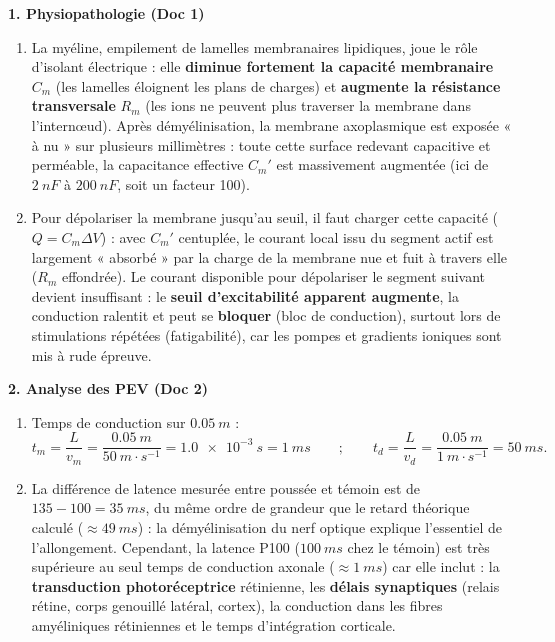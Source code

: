 \documentclass[11pt]{article}
\begin{document}
\begin{corrige}
\textbf{1. Physiopathologie (Doc 1)}
\begin{enumerate}
    \item[a)] La myéline, empilement de lamelles membranaires lipidiques, joue le rôle d'isolant électrique : elle \textbf{diminue fortement la capacité membranaire} $C_m$ (les lamelles éloignent les plans de charges) et \textbf{augmente la résistance transversale} $R_m$ (les ions ne peuvent plus traverser la membrane dans l'internœud). Après démyélinisation, la membrane axoplasmique est exposée « à nu » sur plusieurs millimètres : toute cette surface redevant capacitive et perméable, la capacitance effective $C_m'$ est massivement augmentée (ici de $\SI{2}{nF}$ à $\SI{200}{nF}$, soit un facteur 100).
    \item[b)] Pour dépolariser la membrane jusqu'au seuil, il faut charger cette capacité ($Q = C_m \Delta V$) : avec $C_m'$ centuplée, le courant local issu du segment actif est largement « absorbé » par la charge de la membrane nue et fuit à travers elle ($R_m$ effondrée). Le courant disponible pour dépolariser le segment suivant devient insuffisant : le \textbf{seuil d'excitabilité apparent augmente}, la conduction ralentit et peut se \textbf{bloquer} (bloc de conduction), surtout lors de stimulations répétées (fatigabilité), car les pompes et gradients ioniques sont mis à rude épreuve.
\end{enumerate}
\textbf{2. Analyse des PEV (Doc 2)}
\begin{enumerate}
    \item[a)] Temps de conduction sur $\SI{0,05}{m}$ :
    \[ t_m = \frac{L}{v_m} = \frac{\SI{0,05}{m}}{\SI{50}{m\cdot s^{-1}}} = \SI{1,0e-3}{s} = \SI{1}{ms} \qquad ; \qquad t_d = \frac{L}{v_d} = \frac{\SI{0,05}{m}}{\SI{1}{m\cdot s^{-1}}} = \SI{50}{ms}. \]
    \item[b)] La différence de latence mesurée entre poussée et témoin est de $135 - 100 = \SI{35}{ms}$, du même ordre de grandeur que le retard théorique calculé ($\approx \SI{49}{ms}$) : la démyélinisation du nerf optique explique l'essentiel de l'allongement. Cependant, la latence P100 ($\SI{100}{ms}$ chez le témoin) est très supérieure au seul temps de conduction axonale ($\approx \SI{1}{ms}$) car elle inclut : la \textbf{transduction photoréceptrice} rétinienne, les \textbf{délais synaptiques} (relais rétine, corps genouillé latéral, cortex), la conduction dans les fibres amyéliniques rétiniennes et le temps d'intégration corticale.

\end{enumerate}
\end{corrige}
\end{document}
